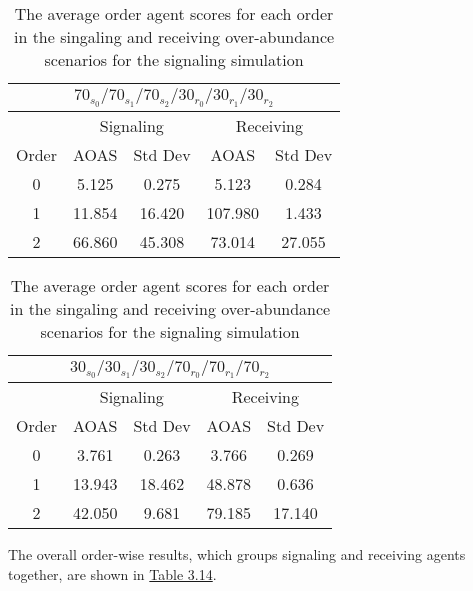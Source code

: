\begin{table}[h]
    \centering
    \begin{tabular}{|c|c|c|c|c|}
    \hline
    \multicolumn{5}{|c|}{$70_{s_{0}}/70_{s_{1}}/70_{s_{2}}/30_{r_{0}}/30_{r_{1}}/30_{r_{2}}$} \\
    \hline
    \multicolumn{1}{|c|}{} & \multicolumn{2}{|c|}{Signaling} & \multicolumn{2}{|c|}{Receiving} \\
    \hline
    Order & AOAS & Std Dev & AOAS & Std Dev \\
    \hline
    0     & 5.125     & 0.275    & 5.123      & 0.284   \\
    1     & 11.854    & 16.420   & 107.980    & 1.433   \\
    2     & 66.860    & 45.308   & 73.014     & 27.055   \\
    \hline
    \end{tabular}
    \qquad
    \begin{tabular}{|c|c|c|c|c|}
    \hline
    \multicolumn{5}{|c|}{$30_{s_{0}}/30_{s_{1}}/30_{s_{2}}/70_{r_{0}}/70_{r_{1}}/70_{r_{2}}$} \\
    \hline
    \multicolumn{1}{|c|}{} & \multicolumn{2}{|c|}{Signaling} & \multicolumn{2}{|c|}{Receiving} \\
    \hline
    Order & AOAS & Std Dev & AOAS & Std Dev \\
    \hline
    0     & 3.761   & 0.263    & 3.766   & 0.269   \\
    1     & 13.943  & 18.462   & 48.878  & 0.636   \\
    2     & 42.050  & 9.681    & 79.185  & 17.140   \\
    \hline
    \end{tabular}
    \caption{The average order agent scores for each order in the singaling and receiving over-abundance scenarios for the signaling simulation}
    \label{table:sig-over-abundance}
\end{table}

The overall order-wise results, which groups signaling and receiving agents together, are shown in \hyperref[table:sig-overall]{Table 3.14}.

